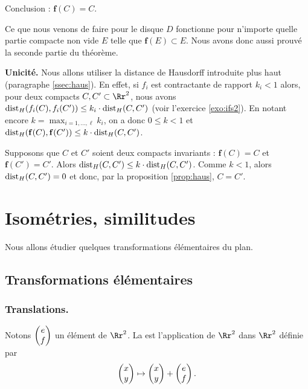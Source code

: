 \documentclass[11pt,class=report,crop=false]{standalone}
\begin{document}
Conclusion :  $\mathbf{f}(C) = C$.


Ce que nous venons de faire pour le disque $D$ fonctionne pour n'importe quelle partie
compacte non vide $E$ telle que $\mathbf{f}(E) \subset E$. Nous avons donc aussi 
prouvé la seconde partie du théorème.

\bigskip

\textbf{Unicité.}
Nous allons utiliser la distance de Hausdorff introduite plus haut (paragraphe \ref{ssec:haus}).
En effet, si $f_i$ est contractante de rapport $k_i < 1$ alors, pour deux compacts
$C,C' \subset \Rr^2$, nous avons 
$\text{dist}_H (f_i(C),f_i(C')) \le k_i \cdot \text{dist}_H (C,C')$ (voir l'exercice \ref{exo:ifs2}).
En notant encore $k = \max_{i=1,\ldots,\ell} k_i$, on a donc $0 \le k < 1$ et 
$\text{dist}_H (\mathbf{f}(C),\mathbf{f}(C')) \le  k  \cdot  \text{dist}_H (C,C')$.

Supposons que $C$ et $C'$ soient deux compacts invariants : $\mathbf{f}(C) = C$ et
$\mathbf{f}(C') = C'$. Alors $\text{dist}_H (C,C') \le k  \cdot  \text{dist}_H (C,C')$.
Comme $k < 1$, alors $\text{dist}_H (C,C')=0$ et donc, par la proposition \ref{prop:haus},
$C=C'$.


\section{Isométries, similitudes}

Nous allons étudier quelques transformations élémentaires du plan.

\subsection{Transformations élémentaires}



\subsubsection*{Translations.}
Notons $\begin{pmatrix}e \\ f\end{pmatrix}$ un élément de $\Rr^2$.
La  est l'application 
de $\Rr^2$ dans $\Rr^2$ définie par
$$\begin{pmatrix}x \\ y\end{pmatrix} \mapsto \begin{pmatrix}x \\ y\end{pmatrix} + \begin{pmatrix}e \\ f\end{pmatrix}.$$
\end{document}
